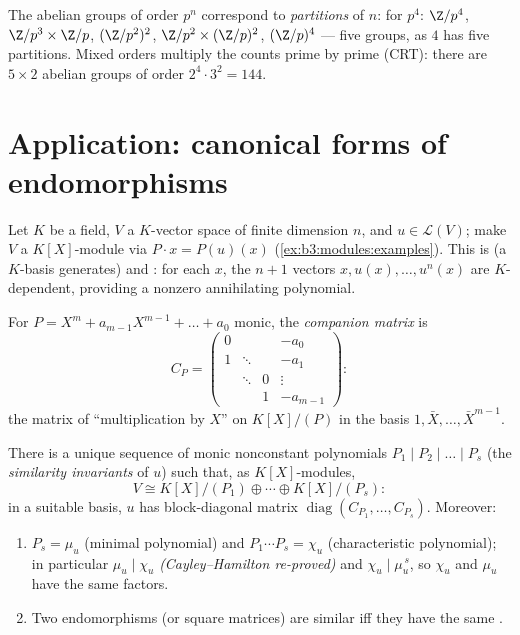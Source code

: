 \begin{example}\label{ex:b3:modules:abelian}
The abelian groups of order $p^n$ correspond to \emph{partitions}
of $n$: for $p^4$: $\Z/p^4$, $\Z/p^3\times\Z/p$,
$(\Z/p^2)^2$, $\Z/p^2 \times (\Z/p)^2$, $(\Z/p)^4$ --- five
groups, as $4$ has five partitions. Mixed orders multiply the
counts prime by prime (CRT): there are $5 \times 2$ abelian
groups of order $2^4 \cdot 3^2 = 144$.
\end{example}

\section{Application: canonical forms of endomorphisms}

Let $K$ be a field, $V$ a $K$-vector space of finite dimension
$n$, and $u \in \mathcal L(V)$; make $V$ a $K[X]$-module via $P
\cdot x = P(u)(x)$ (\cref{ex:b3:modules:examples}). This 
is  (a $K$-basis generates) and : for
each $x$, the $n+1$ vectors $x, u(x), \dots, u^n(x)$ are
$K$-dependent, providing a nonzero annihilating polynomial.

\begin{definition}\label{def:b3:modules:companion}
For $P = X^m + a_{m-1}X^{m-1} + \dots + a_0$ monic, the
\emph{companion matrix} is
\[
C_P = \begin{pmatrix}
0 & & & -a_0\\
1 & \ddots & & -a_1\\
& \ddots & 0 & \vdots\\
& & 1 & -a_{m-1}
\end{pmatrix} :
\]
the matrix of ``multiplication by $X$'' on $K[X]/(P)$ in the
basis $1, \bar X, \dots, \bar X^{m-1}$.
\end{definition}

\begin{theorem}
\label{thm:b3:modules:frobenius}
There is a unique sequence of monic nonconstant polynomials $P_1
\mid P_2 \mid \dots \mid P_s$ (the \emph{similarity
invariants} of $u$) such that, as
$K[X]$-modules,
\[
V \cong K[X]/(P_1) \oplus \cdots \oplus K[X]/(P_s):
\]
in a suitable basis, $u$ has block-diagonal matrix
$\operatorname{diag}(C_{P_1}, \dots, C_{P_s})$. Moreover:
\begin{enumerate}
  \item $P_s = \mu_u$ (minimal polynomial) and $P_1\cdots P_s =
        \chi_u$ (characteristic polynomial); in particular $\mu_u
        \mid \chi_u$ \emph{(Cayley--Hamilton re-proved)} and
        $\chi_u \mid \mu_u^{\,s}$, so $\chi_u$ and $\mu_u$ have
        the same  factors.
  \item Two endomorphisms (or square matrices) are similar iff
        they have the same .
\end{enumerate}
\end{theorem}

